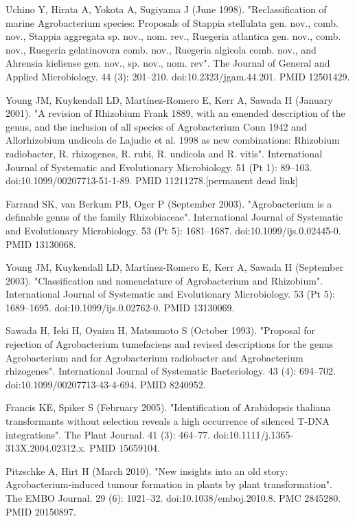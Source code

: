 \documentclass[11pt]{article}
\begin{document}
\begin{thebibliography}{3}
	 Uchino Y, Hirata A, Yokota A, Sugiyama J (June 1998). "Reclassification of marine Agrobacterium species: Proposals of Stappia stellulata gen. nov., comb. nov., Stappia aggregata sp. nov., nom. rev., Ruegeria atlantica gen. nov., comb. nov., Ruegeria gelatinovora comb. nov., Ruegeria algicola comb. nov., and Ahrensia kieliense gen. nov., sp. nov., nom. rev". The Journal of General and Applied Microbiology. 44 (3): 201–210. doi:10.2323/jgam.44.201. PMID 12501429.
	
	 Young JM, Kuykendall LD, Martínez-Romero E, Kerr A, Sawada H (January 2001). "A revision of Rhizobium Frank 1889, with an emended description of the genus, and the inclusion of all species of Agrobacterium Conn 1942 and Allorhizobium undicola de Lajudie et al. 1998 as new combinations: Rhizobium radiobacter, R. rhizogenes, R. rubi, R. undicola and R. vitis". International Journal of Systematic and Evolutionary Microbiology. 51 (Pt 1): 89–103. doi:10.1099/00207713-51-1-89. PMID 11211278.[permanent dead link]
	
	 Farrand SK, van Berkum PB, Oger P (September 2003). "Agrobacterium is a definable genus of the family Rhizobiaceae". International Journal of Systematic and Evolutionary Microbiology. 53 (Pt 5): 1681–1687. doi:10.1099/ijs.0.02445-0. PMID 13130068.
	
	 Young JM, Kuykendall LD, Martínez-Romero E, Kerr A, Sawada H (September 2003). "Classification and nomenclature of Agrobacterium and Rhizobium". International Journal of Systematic and Evolutionary Microbiology. 53 (Pt 5): 1689–1695. doi:10.1099/ijs.0.02762-0. PMID 13130069.
	
	 Sawada H, Ieki H, Oyaizu H, Matsumoto S (October 1993). "Proposal for rejection of Agrobacterium tumefaciens and revised descriptions for the genus Agrobacterium and for Agrobacterium radiobacter and Agrobacterium rhizogenes". International Journal of Systematic Bacteriology. 43 (4): 694–702. doi:10.1099/00207713-43-4-694. PMID 8240952.
	
	 Francis KE, Spiker S (February 2005). "Identification of Arabidopsis thaliana transformants without selection reveals a high occurrence of silenced T-DNA integrations". The Plant Journal. 41 (3): 464–77. doi:10.1111/j.1365-313X.2004.02312.x. PMID 15659104.
	
	 Pitzschke A, Hirt H (March 2010). "New insights into an old story: Agrobacterium-induced tumour formation in plants by plant transformation". The EMBO Journal. 29 (6): 1021–32. doi:10.1038/emboj.2010.8. PMC 2845280. PMID 20150897.
	

\end{thebibliography}
\end{document}
